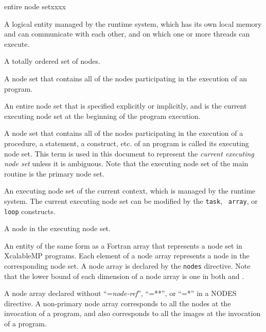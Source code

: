 \begin{namelist}{entire node setxxxx}


  A logical entity managed by the {\XMP} runtime system, which has
  its own local memory and can communicate with each other, and on which
  one or more threads can execute.


 A totally ordered set of nodes.


 A node set that contains all of the nodes participating in the
 execution of an {\XMP} program.


 An entire node set that is specified explicitly or implicitly, and is
 the current executing node set at the beginning of the program
 execution.


 A node set that contains all of the nodes participating in the
 execution of a procedure, a statement, a construct, etc. of an
 {\XMP} program is called its executing node set.
%
 This term is used in this document to represent the {\it current
 executing node set} unless it is ambiguous.
%
 Note that the executing node set of the main routine is the
 primary node set.


 An executing node set of the current context, which is managed by the
 {\XMP} runtime system.
%
 The current executing node set can be modified by the {\tt task}, {\tt
 array}, or {\tt loop} constructs. 


 A node in the executing node set.


 An {\XMP} entity of the same form as a Fortran array that represents a
 node set in XcalableMP programs. Each element of a node array
 represents a node in the corresponding node set. A node array is
 declared by the {\tt nodes} directive. Note that the lower bound of
 each dimension of a node array is one in both {\XMPF} and {\XMPC}.




A node array declared without ``={\it node-ref}'', ``=**'', or ``=*''
in a NODES directive.
A non-primary node array corresponds to all the nodes at the invocation of
a program, and also corresponds to all the images at the invocation of
a program.



\end{namelist}
